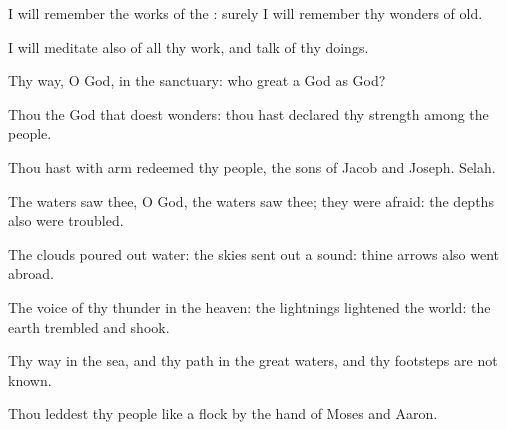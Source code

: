 {\Q {}I will
remember the
works of the
{}: surely I will
remember thy
wonders of
old.


\par }{\Q {}I will
meditate also of all thy
work, and
talk of thy
doings.


\par }{\Q {}Thy
way, O
God,
{} in the
sanctuary: who
{}
great a
God as
{}
God?


\par }{\Q {}Thou
{} the
God that
doest
wonders: thou hast
declared thy
strength among the
people.


\par }{\Q {}Thou hast with
{}
arm
redeemed thy
people, the
sons of
Jacob and
Joseph.
Selah.


\par }{\Q {}The
waters
saw thee, O
God, the
waters
saw thee; they were
afraid: the
depths also were
troubled.


\par }{\Q {}The
clouds poured
out
water: the
skies sent
out a
sound: thine
arrows also went
abroad.


\par }{\Q {}The
voice of thy
thunder
{} in the
heaven: the
lightnings
lightened the
world: the
earth
trembled and
shook.


\par }{\Q {}Thy
way
{} in the
sea, and thy
path in the
great
waters, and thy
footsteps are not
known.


\par }{\Q {}Thou
leddest thy
people like a
flock by the
hand of
Moses and
Aaron.




\par }
